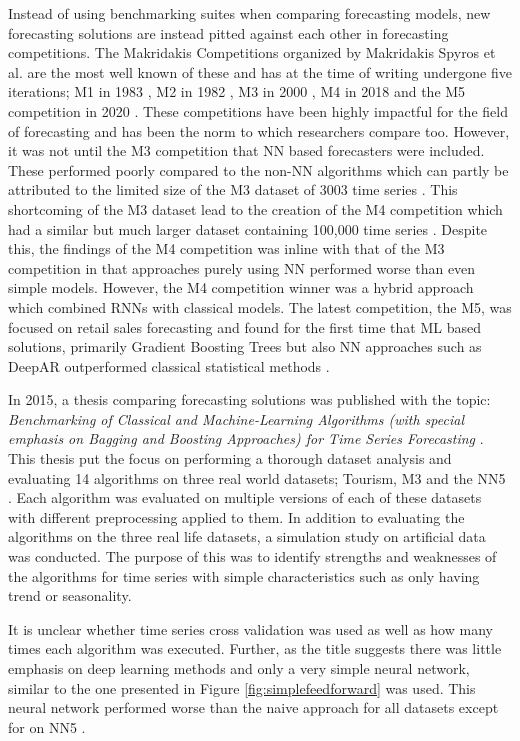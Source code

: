 Instead of using benchmarking suites when comparing forecasting models, new forecasting solutions are instead pitted against each other in forecasting competitions. The Makridakis Competitions organized by Makridakis Spyros et al. are the most well known of these and has at the time of writing undergone five iterations; M1 in 1983 \cite{makridakis1987confidence}, M2 in 1982 \cite{makridakis1993m2}, M3 in 2000 \cite{m3_competition}, M4 in 2018 \cite{makridakis_m4_2020} and the M5 competition in 2020 \cite{m5}. These competitions have been highly impactful for the field of forecasting and has been the norm to which researchers compare too. However, it was not until the M3 competition that NN based forecasters were included. These performed poorly compared to the non-NN algorithms which can partly be attributed to the limited size of the M3 dataset of 3003 time series \cite{m3_competition}. This shortcoming of the M3 dataset lead to the creation of the M4 competition which had a similar but much larger dataset containing 100,000 time series \cite{makridakis_m4_2020}. Despite this, the findings of the M4 competition was inline with that of the M3 competition in that approaches purely using NN performed worse than even simple models. However, the M4 competition winner was a hybrid approach which combined RNNs with classical models. The latest competition, the M5, was focused on retail sales forecasting and found for the first time that ML based solutions, primarily Gradient Boosting Trees but also NN approaches such as DeepAR outperformed classical statistical methods \cite{m5}.

In 2015, a thesis comparing forecasting solutions was published with the topic: \textit{Benchmarking of Classical and Machine-Learning Algorithms (with special emphasis on Bagging and Boosting Approaches) for Time Series Forecasting} \cite{other_thesis}. This thesis put the focus on performing a thorough dataset analysis and evaluating 14 algorithms on three real world datasets; Tourism, M3 and the NN5 \cite{NN5_website}. Each algorithm was evaluated on multiple versions of each of these datasets with different preprocessing applied to them. In addition to evaluating the algorithms on the three real life datasets, a simulation study on artificial data was conducted. The purpose of this was to identify strengths and weaknesses of the algorithms for time series with simple characteristics such as only having trend or seasonality.

It is unclear whether time series cross validation was used as well as how many times each algorithm was executed. Further, as the title suggests there was little emphasis on deep learning methods and only a very simple neural network, similar to the one presented in Figure \ref{fig:simplefeedforward} was used. This neural network performed worse than the naive approach for all datasets except for on NN5 \cite{other_thesis}.



